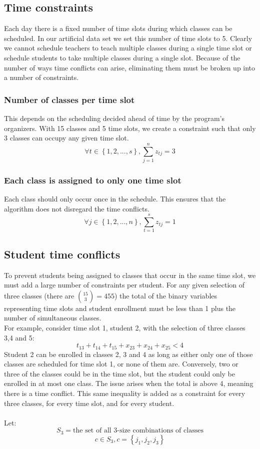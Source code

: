 \documentclass[11pt]{article}
\begin{document}
\subsection{Time constraints}
Each day there is a fixed number of time slots during which classes can be scheduled. In our artificial data set we set this number of time slots to 5. Clearly we cannot schedule teachers to teach multiple classes during a single time slot or schedule students to take multiple classes during a single slot. Because of the number of ways time conflicts can arise, eliminating them must be broken up into a number of constraints.\\
\subsubsection{Number of classes per time slot}
This depends on the scheduling decided ahead of time by the program's organizers. With 15 classes and 5 time slots, we create a constraint such that only 3 classes can occupy any given time slot.
\[\forall t \in \left\{ {1,2,...,s}\right\}, \sum_{j=1}^{n}z_{tj} = 3\]
\subsubsection{Each class is assigned to only one time slot}
Each class should only occur once in the schedule. This ensures that the algorithm does not disregard the time conflicts.
\[\forall j \in \left\{ {1,2,...,n}\right\}, \sum_{t=1}^{s}z_{tj} = 1\]
\subsection{Student time conflicts}
To prevent students being assigned to classes that occur in the same time slot, we must add a large number of constraints per student. For any given selection of three classes (there are $\binom {15}{3} = 455$) the total of the binary variables representing time slots and student enrollment must be less than 1 plus the number of simultaneous classes.\\ 
\indent For example, consider time slot 1, student 2, with the selection of three classes 3,4 and 5:\\
\[t_{13}+t_{14}+t_{15}+x_{23} +x_{24} +x_{25} < 4 \]
Student 2 can be enrolled in classes 2, 3 and 4 as long as either only one of those classes are scheduled for time slot 1, or none of them are. Conversely, two or three of the classes could be in the time slot, but the student could only be enrolled in at most one class. The issue arises when the total is above 4, meaning there is a time conflict. This same inequality is added as a constraint for every three classes, for every time slot, and for every student.\\\\
\indent Let:
\[S_3 = \text{the set of all 3-size combinations of classes}\]
\[c \in S_3, c = \left\{ {j_1, j_2, j_3}\right\}\]
\end{document}
